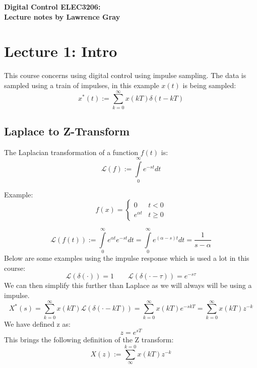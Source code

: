 \documentclass[a4paper,11pt]{article}
\begin{document}
  
\begin{center}

{\Large{\textbf{Digital Control ELEC3206:}}} \\ 
{\Large{\textbf{Lecture notes by Lawrence Gray}}} \\ [\baselineskip]
\end{center}
\section{Lecture 1: Intro }
	This course concerns using digital control using impulse sampling. The data is sampled using a train of impulses, in this example $x(t)$ is being sampled:
\begin{equation}
	x^*(t):= \sum\limits_{k=0}^{\infty}x(kT)\delta(t-kT)
	\end{equation}
	\subsection{Laplace to Z-Transform}
		The Laplacian transformation of a function $f(t)$ is:\\
		\begin{equation}
		\mathcal{L}(f):= \int\limits_{0}^{\infty}e^{-st}dt
		\end{equation}

		Example:\\
		
		\[ f(x) =\begin{cases} 
      			0 & t < 0\\
      			e^{\alpha t}& t \geq 0
   			\end{cases}
			\]

		\begin{equation}
		\mathcal{L}(f(t)):= \int\limits_{0}^{\infty}e^{\alpha t}e^{-st}dt =\int\limits_{0}^{\infty}e^{(\alpha -s)t}dt= \frac{1}{s-\alpha}		\end{equation}
		Below are some examples using the impulse response which is used a lot in this course:
		\begin{equation}
		    \mathcal{L}(\delta(\cdot))=1
		    \qquad
		    \mathcal{L}(\delta(\cdot-\tau))=e^{-s \tau}
		\end{equation}
		We can then simplify this further than Laplace as we will always will be using a impulse.
		\begin{equation}
		    X^*(s)=\sum\limits_{k=0}^{\infty} x(kT)\mathcal{L}(\delta(\cdot-kT)) = \sum\limits_{k=0}^{\infty}x(kT)e^{-skT}= \sum\limits_{k=0}^{\infty}x(kT)z^{-k}
		\end{equation}
		We have defined z as:
		\begin{equation}
		    z=e^{sT}
		\end{equation}
		This brings the following definition of the Z transform:
		\begin{equation}
		    X(z):= \sum\limits_{\infty}^{k=0}x(kT)z^{-k}	
		\end{equation}		
\newpage
\end{document}
